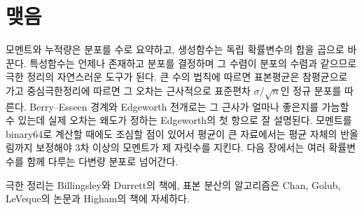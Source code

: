 \section{맺음}

모멘트와 누적량은 분포를 수로 요약하고, 생성함수는 독립 확률변수의 합을 곱으로 바꾼다. 특성함수는 언제나 존재하고 분포를 결정하며 그 수렴이 분포의 수렴과 같으므로 극한 정리의 자연스러운 도구가 된다. 큰 수의 법칙에 따르면 표본평균은 참평균으로 가고 중심극한정리에 따르면 그 오차는 근사적으로 표준편차 $\sigma/\sqrt n$인 정규 분포를 따른다. Berry--Esseen 경계와 Edgeworth 전개로는 그 근사가 얼마나 좋은지를 가늠할 수 있는데 실제 오차는 왜도가 정하는 Edgeworth의 첫 항으로 잘 설명된다. 모멘트를 binary64로 계산할 때에도 조심할 점이 있어서 평균이 큰 자료에서는 평균 자체의 반올림까지 보정해야 3차 이상의 모멘트가 제 자릿수를 지킨다. 다음 장에서는 여러 확률변수를 함께 다루는 다변량 분포로 넘어간다.

극한 정리는 Billingsley\cite{billingsley1995}와 Durrett\cite{durrett2019}의 책에, 표본 분산의 알고리즘은 Chan, Golub, LeVeque의 논문\cite{chan1983variance}과 Higham의 책\cite{higham2002accuracy}에 자세하다.

\chapterreferences
